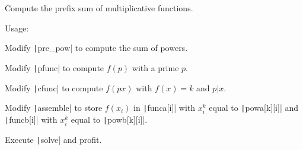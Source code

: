 Compute the prefix sum of multiplicative functions.

Usage:
\begin{compactenum}
	\item Modify \texttt|pre_pow| to compute the sum of powers.
	\item Modify \texttt|pfunc| to compute $f(p)$ with a prime $p$.
	\item Modify \texttt|cfunc| to compute $f(px)$ with $f(x)=k$ and $p|x$.
	\item Modify \texttt|assemble| to store $f(x_i)$ in \texttt|funca[i]| with $x_i^k$ equal to \texttt|powa[k][i]| and \texttt|funcb[i]| with $x_i^k$ equal to \texttt|powb[k][i]|.
	\item Execute \texttt|solve| and profit.
\end{compactenum}

\inputminted{cpp}{src/mathematics/computation/extended-eratosthenes-sieve.cpp.com}

